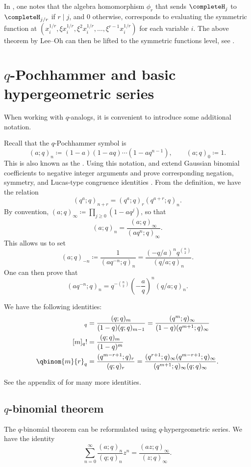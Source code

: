 In \cite{Albion2023}, one notes that the algebra homomorphism $\phi_r$ that sends $\completeH_j$ to $\completeH_{j/r}$
if $r \mid j$, and $0$ otherwise, corresponds to evaluating the symmetric function at
$(x_i^{1/r}, \xi x_i^{1/r}, \xi^2 x_i^{1/r}, \dotsc, \xi^{r-1} x_i^{1/r})$ for each variable $i$.
The above theorem by Lee--Oh can then be lifted to the symmetric functions level, see \cite{Albion2023}.



\section[basicHypergeometric]{$q$-Pochhammer and basic hypergeometric series}

When working with $q$-analogs, it is convenient to introduce some additional notation.

Recall that the $q$-Pochhammer symbol is
\[
(a;q)_n \coloneqq (1-a)(1-aq)\dotsm (1-aq^{n-1}), \qquad (a;q)_0 \coloneqq 1.
\]
This is also known as the \label{qShiftedFactorial}.
Using this notation,  and  extend
Gaussian binomial coefficients to negative integer arguments and prove
corresponding negation, symmetry, and Lucas-type congruence identities
\cite{FormichellaStraub2019}.
From the definition, we have the relation
\[
(q^a;q)_{n+r} = (q^a;q)_{r} (q^{a+r};q)_n.
\]
By convention, $(a;q)_\infty \coloneqq \prod_{j \geq 0}(1-aq^j)$,
so that
\[
(a;q)_n = \frac{(a;q)_\infty}{(aq^{n};q)_\infty}.
\]
This allows us to set
\[
(a;q)_{-n} \coloneqq \frac{1}{ (aq^{-n};q)_n } =
\frac{ (-q/a)^n q^{\binom{n}{2}} }{ (q/a;q)_n }.
\]
One can then prove that
\begin{equation*}
(a q^{-n};q)_{n} = q^{-\binom{n}{2}} \left( -\frac{a}{q} \right)^n (q/a;q)_{n}.
\end{equation*}

We have the following identities:
\begin{align*}
[m]_q &= \frac{ (q;q)_m}{(1-q)(q;q)_{m-1}} =  \frac{(q^{m};q)_\infty}{(1-q)(q^{m+1};q)_\infty} \\
[m]_q! &= \frac{ (q;q)_m}{(1-q)^m} \\
\qbinom{m}{r}_q &= \frac{(q^{m-r+1};q)_r}{(q;q)_r}
 = \frac{(q^{r+1};q)_\infty (q^{m-r+1};q)_\infty }{  (q^{m+1};q)_\infty (q;q)_\infty }.
\end{align*}

See the appendix of \cite{GasperRahman2004} for many more identities.


\subsection[qbinomial]{$q$-binomial theorem}

The $q$-binomial theorem can be reformulated using $q$-hypergeometric series.
We have the identity
\[
\sum_{n=0}^\infty \frac{(a;q)_n}{(q;q)_n}z^n = \frac{(az;q)_\infty}{(z;q)_\infty}.
\]
